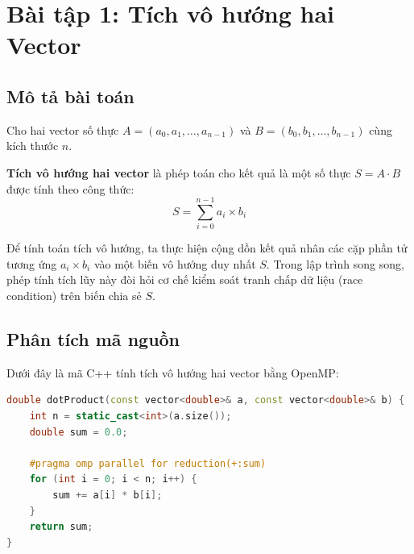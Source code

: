 \chapter{Bài tập 1: Tích vô hướng hai Vector}

\section{Mô tả bài toán}
Cho hai vector số thực $A = (a_0, a_1, \dots, a_{n-1})$ và $B = (b_0, b_1, \dots, b_{n-1})$ cùng kích thước $n$.

\textbf{Tích vô hướng hai vector} là phép toán cho kết quả là một số thực $S = A \cdot B$ được tính theo công thức:
\begin{equation}
  S = \sum_{i=0}^{n-1} a_i \times b_i
\end{equation}

Để tính toán tích vô hướng, ta thực hiện cộng dồn kết quả nhân các cặp phần tử tương ứng $a_i \times b_i$ vào một biến vô hướng duy nhất $S$. Trong lập trình song song, phép tính tích lũy này đòi hỏi cơ chế kiểm soát tranh chấp dữ liệu (race condition) trên biến chia sẻ $S$.

\section{Phân tích mã nguồn}
Dưới đây là mã  C++ tính tích vô hướng hai vector bằng OpenMP:

\begin{lstlisting}[language=C++, caption={Thuật toán tích vô hướng song song sử dụng reduction}]
double dotProduct(const vector<double>& a, const vector<double>& b) {
    int n = static_cast<int>(a.size());
    double sum = 0.0;

    #pragma omp parallel for reduction(+:sum)
    for (int i = 0; i < n; i++) {
        sum += a[i] * b[i];
    }
    return sum;
}
\end{lstlisting}

